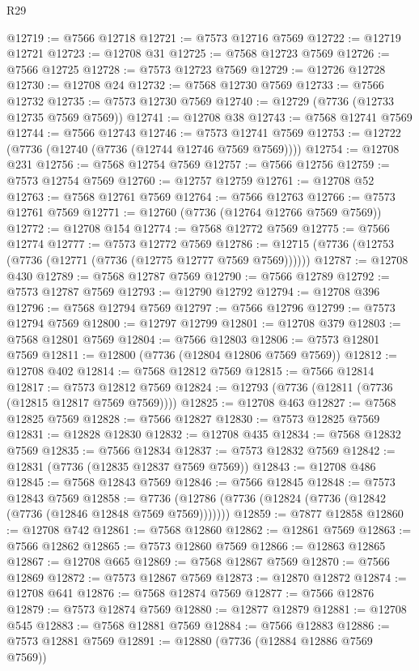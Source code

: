 \begin{lexlean}{R29}
\begin{coremodule}
@12719 := @7566 @12718
@12721 := @7573 @12716 @7569
@12722 := @12719 @12721
@12723 := @12708 @31
@12725 := @7568 @12723 @7569
@12726 := @7566 @12725
@12728 := @7573 @12723 @7569
@12729 := @12726 @12728
@12730 := @12708 @24
@12732 := @7568 @12730 @7569
@12733 := @7566 @12732
@12735 := @7573 @12730 @7569
@12740 := @12729 (@7736 (@12733 @12735 @7569 @7569))
@12741 := @12708 @38
@12743 := @7568 @12741 @7569
@12744 := @7566 @12743
@12746 := @7573 @12741 @7569
@12753 := @12722 (@7736 (@12740 (@7736 (@12744 @12746 @7569 @7569))))
@12754 := @12708 @231
@12756 := @7568 @12754 @7569
@12757 := @7566 @12756
@12759 := @7573 @12754 @7569
@12760 := @12757 @12759
@12761 := @12708 @52
@12763 := @7568 @12761 @7569
@12764 := @7566 @12763
@12766 := @7573 @12761 @7569
@12771 := @12760 (@7736 (@12764 @12766 @7569 @7569))
@12772 := @12708 @154
@12774 := @7568 @12772 @7569
@12775 := @7566 @12774
@12777 := @7573 @12772 @7569
@12786 := @12715 (@7736 (@12753 (@7736 (@12771 (@7736 (@12775 @12777 @7569 @7569))))))
@12787 := @12708 @430
@12789 := @7568 @12787 @7569
@12790 := @7566 @12789
@12792 := @7573 @12787 @7569
@12793 := @12790 @12792
@12794 := @12708 @396
@12796 := @7568 @12794 @7569
@12797 := @7566 @12796
@12799 := @7573 @12794 @7569
@12800 := @12797 @12799
@12801 := @12708 @379
@12803 := @7568 @12801 @7569
@12804 := @7566 @12803
@12806 := @7573 @12801 @7569
@12811 := @12800 (@7736 (@12804 @12806 @7569 @7569))
@12812 := @12708 @402
@12814 := @7568 @12812 @7569
@12815 := @7566 @12814
@12817 := @7573 @12812 @7569
@12824 := @12793 (@7736 (@12811 (@7736 (@12815 @12817 @7569 @7569))))
@12825 := @12708 @463
@12827 := @7568 @12825 @7569
@12828 := @7566 @12827
@12830 := @7573 @12825 @7569
@12831 := @12828 @12830
@12832 := @12708 @435
@12834 := @7568 @12832 @7569
@12835 := @7566 @12834
@12837 := @7573 @12832 @7569
@12842 := @12831 (@7736 (@12835 @12837 @7569 @7569))
@12843 := @12708 @486
@12845 := @7568 @12843 @7569
@12846 := @7566 @12845
@12848 := @7573 @12843 @7569
@12858 := @7736 (@12786 (@7736 (@12824 (@7736 (@12842 (@7736 (@12846 @12848 @7569 @7569)))))))
@12859 := @7877 @12858
@12860 := @12708 @742
@12861 := @7568 @12860
@12862 := @12861 @7569
@12863 := @7566 @12862
@12865 := @7573 @12860 @7569
@12866 := @12863 @12865
@12867 := @12708 @665
@12869 := @7568 @12867 @7569
@12870 := @7566 @12869
@12872 := @7573 @12867 @7569
@12873 := @12870 @12872
@12874 := @12708 @641
@12876 := @7568 @12874 @7569
@12877 := @7566 @12876
@12879 := @7573 @12874 @7569
@12880 := @12877 @12879
@12881 := @12708 @545
@12883 := @7568 @12881 @7569
@12884 := @7566 @12883
@12886 := @7573 @12881 @7569
@12891 := @12880 (@7736 (@12884 @12886 @7569 @7569))

\end{coremodule}
\end{lexlean}
